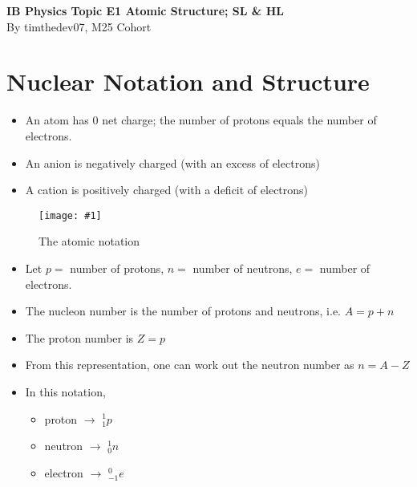 \documentclass[a4paper,12pt]{article}
\let\oldsection\section
\renewcommand\section{\clearpage\oldsection}
\newcommand{\img}[4]{\begin{center}
  \begin{figure}[H]
    \centering
    \texttt{[image: \#1]}
    \caption{#3}
    \label{fig:#4}
  \end{figure}
\end{center}}
\begin{document}
\pagestyle{fancy}


\begin{titlepage}
  \begin{center}

    \vspace*{8cm}
    \textbf{\Large {IB Physics Topic E1 Atomic Structure; SL \& HL}} \\
    \vspace*{1cm}
    \large{By timthedev07, M25 Cohort}


  \end{center}
\end{titlepage}

\pagebreak
\tableofcontents
\pagebreak

\clearpage
\setcounter{page}{1}

\section{Nuclear Notation and Structure}
\begin{itemize}
  \item An atom has 0 net charge; the number of protons equals the number of electrons.
  \item An anion is negatively charged (with an excess of electrons)
  \item A cation is positively charged (with a deficit of electrons)
\end{itemize}

\img{atomicNotation.png}{0.4}{The atomic notation}{atomicnotation}
\begin{itemize}
  \item Let $p = $ number of protons, $n = $ number of neutrons, $e = $ number of electrons.
  \item The nucleon number is the number of protons and neutrons, i.e. $A = p + n$
  \item The proton number is $Z = p$
  \item From this representation, one can work out the neutron number as $n = A - Z$
  \item In this notation,
        \begin{itemize}
          \item proton $\to$ $^1_1p$
          \item neutron $\to$ $^1_0n$
          \item electron $\to$ $^0_{-1}e$
        \end{itemize}
\end{itemize}
\end{document}

